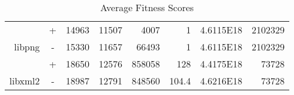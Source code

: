 \begin{table}[H]
\begin{tabular}{|r|c|r|r|r|r|r|r|}
                               & +                                                                           &                          14963                                              &                          11507                                                &                          4007                                                &                     1                                                      &                          4.6115E18                                             &                          2102329                                                               \\ \cline{2-8} 
\multirow{-2}{*}{libpng}       & \cellcolor[HTML]{C0C0C0}-                                                   & \cellcolor[HTML]{C0C0C0} 15330                                              & \cellcolor[HTML]{C0C0C0} 11657                                                & \cellcolor[HTML]{C0C0C0}  66493                                              & \cellcolor[HTML]{C0C0C0}      1                                            & \cellcolor[HTML]{C0C0C0}              4.6115E18                                & \cellcolor[HTML]{C0C0C0} 2102329                                                               \\ \hline \hline
                               & +                                                                           &       18650                                                                 &                          12576                                                &                            858058                                            &                                      128                                   &                          4.4175E18                                             &                          73728                                                                 \\ \cline{2-8} 
\multirow{-2}{*}{libxml2}      & \cellcolor[HTML]{C0C0C0}-                                                   & \cellcolor[HTML]{C0C0C0}    18987                                           & \cellcolor[HTML]{C0C0C0} 12791                                                & \cellcolor[HTML]{C0C0C0}   848560                                            & \cellcolor[HTML]{C0C0C0}    104.4                                          & \cellcolor[HTML]{C0C0C0} 4.6216E18                                             & \cellcolor[HTML]{C0C0C0} 73728                                                                 \\ \hline
\end{tabular}
\caption{Average Fitness Scores}
\label{tbl:fitness}
\end{table}

